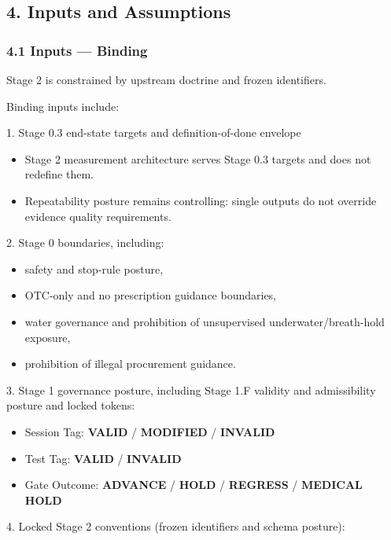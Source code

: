 \documentclass[10pt]{article}
\begin{document}
\subsection*{4. Inputs and Assumptions}

\subsubsection*{4.1 Inputs — Binding}

Stage 2 is constrained by upstream doctrine and frozen identifiers.

Binding inputs include:

1. Stage 0.3 end-state targets and definition-of-done envelope

\begin{itemize}
\item Stage 2 measurement architecture serves Stage 0.3 targets and does not redefine them.
\item Repeatability posture remains controlling: single outputs do not override evidence quality requirements.
\end{itemize}

2. Stage 0 boundaries, including:

\begin{itemize}
\item safety and stop-rule posture,
\item OTC-only and no prescription guidance boundaries,
\item water governance and prohibition of unsupervised underwater/breath-hold exposure,
\item prohibition of illegal procurement guidance.
\end{itemize}

3. Stage 1 governance posture, including Stage 1.F validity and admissibility posture and locked tokens:

\begin{itemize}
\item Session Tag: \textbf{VALID} / \textbf{MODIFIED} / \textbf{INVALID}
\item Test Tag: \textbf{VALID} / \textbf{INVALID}
\item Gate Outcome: \textbf{ADVANCE} / \textbf{HOLD} / \textbf{REGRESS} / \textbf{MEDICAL} \textbf{HOLD}
\end{itemize}

4. Locked Stage 2 conventions (frozen identifiers and schema posture):
\end{document}
